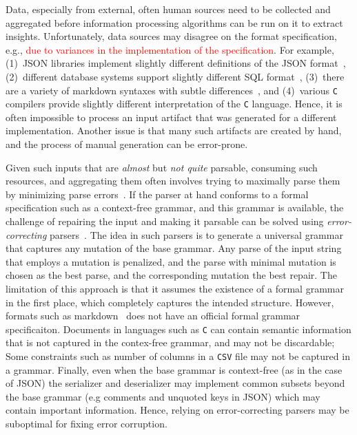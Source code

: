 \documentclass[sigconf,review,anonymous]{acmart}
\def\<#1>{\texttt{#1}}
\newcommand{\recheck}[1]{\textcolor{red}{#1}}
\begin{document}
Data, especially from external, often human sources need to be collected and
aggregated before information processing algorithms can be run on it to extract
insights. Unfortunately, data sources may disagree on the format specification, e.g., \recheck{due to variances in the implementation of the specification}.
For example, (1)~JSON libraries implement slightly different
definitions of the JSON format~\cite{harrand2021behavioral,seriot2016parsing},
(2)~different database systems support %
slightly different SQL format~\cite{arvin2018comparison}, (3)~there are a variety of markdown
syntaxes with subtle differences~\cite{visnoviz2019comparison}, and (4)~various
\<C> compilers %
provide slightly different interpretation of the \<C> language.
Hence, it is often impossible to process an input artifact that was generated for
a different implementation. %
Another issue is that many such artifacts
are created by hand, and the process of manual generation can be error-prone.

Given such inputs that are \emph{almost} but \emph{not quite} parsable,
consuming such resources, and aggregating them often involves trying to
maximally parse them by minimizing parse errors~\cite{kirschner2020debugging}.
If the parser at hand conforms to a formal specification such as a context-free
grammar, and this grammar is available,
the challenge of repairing the input and making it parsable can be solved using
\emph{error-correcting} parsers~\cite{aho1972minimum,diekmann2020dont,parr2011ll}.
The idea in such parsers is to generate a universal grammar that captures
any mutation of the base grammar. Any parse of the input string that employs a
mutation is penalized, and the parse with minimal mutation is chosen as the
best parse, and the corresponding mutation the best repair. The limitation of
this approach is that it assumes the existence of a formal grammar in the first
place, which completely captures the intended structure. 
However, formats such as markdown~\cite{gruber2004markdown} does not have
an official formal grammar specificaiton.
Documents in languages such as \<C> can contain semantic
information that is not captured in the contex-free grammar, and may not be
discardable; Some constraints such as number of columns in a \<CSV> file may
not be captured in a grammar. Finally, even when the base grammar is context-free
(as in the case of JSON) the serializer and deserializer may implement common
subsets beyond the base grammar (e.g comments and unquoted keys in JSON) which may
contain important information. Hence, relying on error-correcting parsers may
be suboptimal for fixing error corruption.
\end{document}
